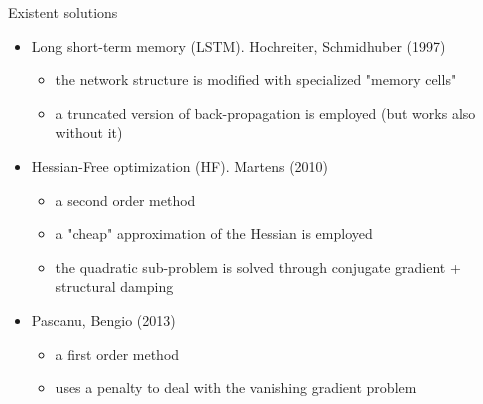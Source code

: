 \begin{frame}{Existent solutions}
	
	\begin{itemize}
		\item Long short-term memory (LSTM). Hochreiter, Schmidhuber (1997)\cite{lstm}
			\begin{itemize}
				\item the network structure is modified with specialized "memory cells"
				\item a truncated version of back-propagation is employed (but works also without it)
			\end{itemize}
		\pause
		\item Hessian-Free optimization (HF). Martens (2010) \cite{hessianFree}
		\begin{itemize}
			\item a second order method
			\item a "cheap" approximation of the Hessian is employed
			\item the quadratic sub-problem is solved through conjugate gradient + structural damping
		\end{itemize}
		\pause
		\item Pascanu, Bengio (2013) \cite{pascanu}
		\begin{itemize}
			\item a first order method
			\item uses a penalty to deal with the vanishing gradient problem
		\end{itemize}
	\end{itemize}
	
\end{frame}

